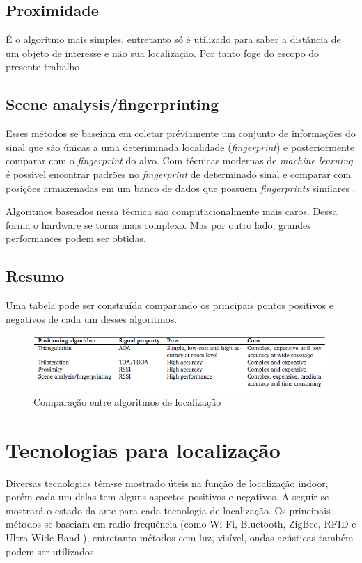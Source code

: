 \subsection{Proximidade}
É o algoritmo mais simples, entretanto só é utilizado para saber a distância de um objeto de interesse e não sua localização. Por tanto foge do escopo do presente trabalho.


\subsection{Scene analysis/fingerprinting}

Esses métodos se baseiam em coletar préviamente um conjunto de informações do sinal que são únicas a uma deteriminada localidade (\textit{fingerprint}) e posteriormente comparar com o \textit{fingerprint} do alvo. Com técnicas modernas de \textit{machine learning} é possivel encontrar padrões no \textit{fingerprint} de determinado sinal e comparar com posições armazenadas em um banco de dados que possuem \textit{fingerprints} similares \cite{art13}.

Algoritmos baseados nessa técnica são computacionalmente mais caros. Dessa forma o hardware se torna mais complexo. Mas por outro lado, grandes performances podem ser obtidas.

\subsection{Resumo}

Uma tabela pode ser construída comparando os principais pontos positivos e negativos de cada um desses algoritmos.
\begin{figure}[H]
	\centering 
	\includegraphics[scale = 1]{images/algorithms_table.png}
	\caption{Comparação entre algoritmos de localização \cite{art1}}
	\label{fig:algorithms_table.png}
\end{figure}

\section{Tecnologias para localização}
Diversas tecnologias têm-se mostrado úteis na função de localização indoor, porém cada um delas tem alguns aspectos positivos e negativos. A seguir se mostrará o estado-da-arte para cada tecnologia de localização. Os principais métodos se baseiam em radio-frequência (como Wi-Fi, Bluetooth, ZigBee, RFID e Ultra Wide Band ), entretanto métodos com luz, visível, ondas acústicas também podem ser utilizados.

